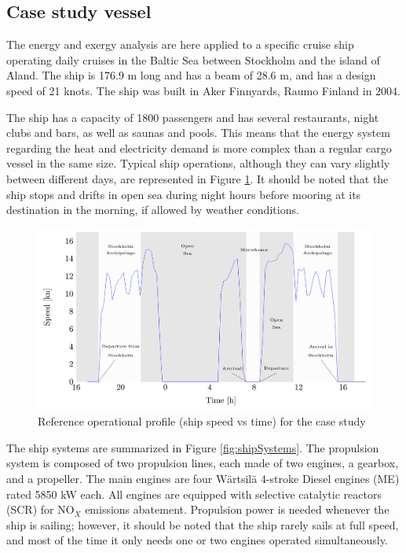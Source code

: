 \documentclass[preprint,12pt]{elsarticle}
\begin{document}
\subsection{Case study vessel} \label{sec:met:case}

The energy and exergy analysis are here applied to a specific  cruise ship operating daily cruises in the Baltic Sea between Stockholm and the island of \.{A}land. The ship is 176.9 m long and has a beam of 28.6 m, and has a design speed of 21 knots. The ship was built in Aker Finnyards, Raumo Finland in 2004.

The ship has a capacity of 1800 passengers and has several restaurants, night clubs and bars, as well as saunas and pools. This means that the energy system regarding the heat and electricity demand is more complex than a regular cargo vessel in the same size. Typical ship operations, although they can vary slightly between different days, are represented in Figure \ref{fig:typicalShipOperations}. It should be noted that the ship stops and drifts in open sea during night hours before mooring at its destination in the morning, if allowed by weather conditions.

\begin{figure}
	\centering
	\includegraphics[width=0.95\linewidth]{Figures/ShipOperationalProfile}
	\caption{Reference operational profile (ship speed vs time) for the case study}
	\label{fig:typicalShipOperations}
\end{figure}


The ship systems are summarized in Figure \ref{fig:shipSystems}. The propulsion system is composed of two propulsion lines, each made of two engines, a gearbox, and a propeller. The main engines are four W\"{a}rtsil\"{a} 4-stroke Diesel engines (ME) rated 5850 kW each. All engines are equipped with selective catalytic reactors (SCR) for NO$_X$ emissions abatement. Propulsion power is needed whenever the ship is sailing; however, it should be noted that the ship rarely sails at full speed, and most of the time it only needs one or two engines operated simultaneously.
\end{document}
